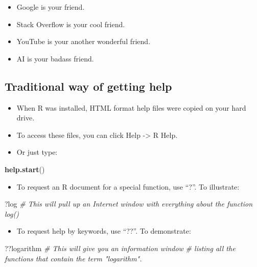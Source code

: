 \documentclass[
]{book}
\newenvironment{Shaded}{\begin{snugshade}}{\end{snugshade}}
\newcommand{\CommentTok}[1]{\textcolor[rgb]{0.56,0.35,0.01}{\textit{#1}}}
\newcommand{\FunctionTok}[1]{\textcolor[rgb]{0.13,0.29,0.53}{\textbf{#1}}}
\newcommand{\NormalTok}[1]{#1}
\providecommand{\tightlist}{%
  \setlength{\itemsep}{0pt}\setlength{\parskip}{0pt}}
\begin{document}
\begin{itemize}
\tightlist
\item
  Google is your friend.
\item
  Stack Overflow is your cool friend.
\item
  YouTube is your another wonderful friend.
\item
  AI is your badass friend.
\end{itemize}

\subsection{Traditional way of getting help}\label{traditional-way-of-getting-help}

\begin{itemize}
\tightlist
\item
  When R was installed, HTML format help files were copied on your hard drive.
\item
  To access these files, you can click Help -\textgreater{} R Help.
\item
  Or just type:
\end{itemize}

\begin{Shaded}
\begin{Highlighting}[]
\FunctionTok{help.start}\NormalTok{()}
\end{Highlighting}
\end{Shaded}

\begin{itemize}
\tightlist
\item
  To request an R document for a special function, use ``?''. To illustrate:
\end{itemize}

\begin{Shaded}
\begin{Highlighting}[]
\NormalTok{?log}
\CommentTok{\# This will pull up an Internet window with everything about the function log()}
\end{Highlighting}
\end{Shaded}

\begin{itemize}
\tightlist
\item
  To request help by keywords, use ``??''. To demonstrate:
\end{itemize}

\begin{Shaded}
\begin{Highlighting}[]
\NormalTok{??logarithm}
\CommentTok{\# This will give you an information window }
\CommentTok{\# listing all the functions that contain the term "logarithm".}
\end{Highlighting}
\end{Shaded}
\end{document}
